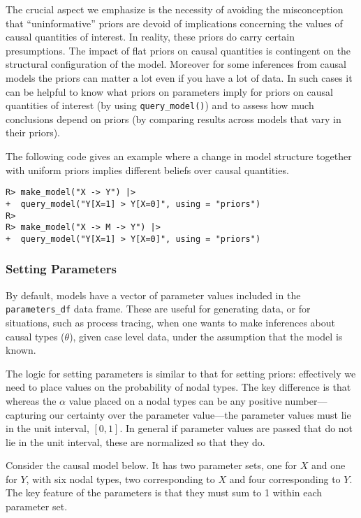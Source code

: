 \documentclass[
  11pt,
  article]{jss}
\begin{document}
The crucial aspect we emphasize is the necessity of avoiding the
misconception that ``uninformative'' priors are devoid of implications
concerning the values of causal quantities of interest. In reality,
these priors do carry certain presumptions. The impact of flat priors on
causal quantities is contingent on the structural configuration of the
model. Moreover for some inferences from causal models the priors can
matter a lot even if you have a lot of data. In such cases it can be
helpful to know what priors on parameters imply for priors on causal
quantities of interest (by using \texttt{query\_model()}) and to assess
how much conclusions depend on priors (by comparing results across
models that vary in their priors).

The following code gives an example where a change in model structure
together with uniform priors implies different beliefs over causal
quantities.

\begin{verbatim}
R> make_model("X -> Y") |>
+  query_model("Y[X=1] > Y[X=0]", using = "priors")
R> 
R> make_model("X -> M -> Y") |>
+  query_model("Y[X=1] > Y[X=0]", using = "priors")
\end{verbatim}

\hypertarget{parameters}{%
\subsubsection{Setting Parameters}\label{parameters}}

By default, models have a vector of parameter values included in the
\texttt{parameters\_df} data frame. These are useful for generating
data, or for situations, such as process tracing, when one wants to make
inferences about causal types (\(\theta\)), given case level data, under
the assumption that the model is known.

The logic for setting parameters is similar to that for setting priors:
effectively we need to place values on the probability of nodal types.
The key difference is that whereas the \(\alpha\) value placed on a
nodal types can be any positive number---capturing our certainty over
the parameter value---the parameter values must lie in the unit
interval, \([0,1]\). In general if parameter values are passed that do
not lie in the unit interval, these are normalized so that they do.

Consider the causal model below. It has two parameter sets, one for
\(X\) and one for \(Y\), with six nodal types, two corresponding to
\(X\) and four corresponding to \(Y\). The key feature of the parameters
is that they must sum to 1 within each parameter set.
\end{document}
